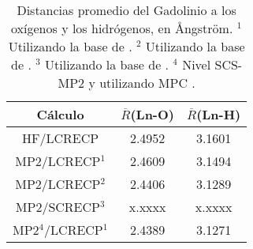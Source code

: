 \begin{table}[h!]
\centering  %
\caption{\footnotesize Distancias promedio del Gadolinio a los ox\'igenos
y los hidr\'ogenos, en {\AA}ngstr\"om.
{\footnotesize $^1$ Utilizando la base de \cite{Dolg1993}.} 
{\footnotesize $^2$ Utilizando la base de \cite{Yang2005}.}
{\footnotesize $^3$ Utilizando la base de \cite{Cao2002}.}  
{\footnotesize $^4$ Nivel SCS-MP2 \citep{Grim2003} y utilizando MPC 
\citep{Toma2005}.}}
\begin{tabular}{c|cc}\hline\hline
C\'alculo & $\overline R$(Ln-O) & $\overline R$(Ln-H) \\ \hline
HF/LCRECP & 2.4952 & 3.1601 \\ 
MP2/LCRECP$^1$ & 2.4609 & 3.1494  \\ 
MP2/LCRECP$^2$ & 2.4406 & 3.1289  \\ 
MP2/SCRECP$^3$ & x.xxxx & x.xxxx  \\ 
MP2$^4$/LCRECP$^1$ & 2.4389 & 3.1271  \\ 
\hline \end{tabular}\label{tD9+0}\end{table}
